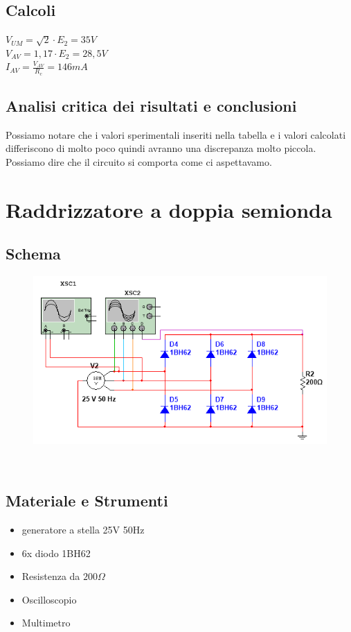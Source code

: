 \documentclass[12pt]{article}
\begin{document}
\subsection{Calcoli}
$V_{UM}=\sqrt{2}\cdot E_2=35V$\\
$V_{AV}=1,17\cdot E_{2}=28,5V$\\
$I_{AV}=\frac{V_{AV}}{R_c}=146 mA$\\
\subsection{Analisi critica dei risultati e conclusioni}
Possiamo notare che i valori sperimentali inseriti nella tabella e i valori calcolati differiscono di 
molto poco quindi avranno una discrepanza molto piccola.\\
Possiamo dire che il circuito si comporta come ci aspettavamo.\\

\section{Raddrizzatore a doppia semionda}

\subsection{Schema}
\begin{figure}[!h]
    \centering
    \includegraphics[scale=0.7]{schemdoppsem.PNG}
\end{figure}
\
\subsection{Materiale e Strumenti}
\label{Materiale e Strumenti}
\begin{multicols}{2}
    \begin{itemize}
    \item generatore a stella 25V 50Hz
    \item 6x diodo 1BH62
    \item Resistenza da $200\Omega$
    \end{itemize}
    \vfill\null
    \columnbreak
    \begin{itemize}
    \item Oscilloscopio
    \item Multimetro
    \end{itemize}
    \vfill\null
    \end{multicols}
\vspace{15pt}
\end{document}
